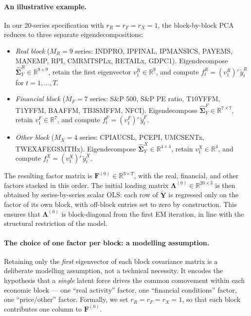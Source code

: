 \documentclass[11pt, a4paper, oneside]{article}
\begin{document}
\paragraph{An illustrative example.}
In our 20-series specification with $r_R = r_F = r_X = 1$, the
block-by-block PCA reduces to three separate eigendecompositions:

\begin{itemize}[leftmargin=1.5em, itemsep=2pt]
  \item \emph{Real block} ($M_R = 9$ series: INDPRO, IPFINAL, IPMANSICS,
        PAYEMS, MANEMP, RPI, CMRMTSPLx, RETAILx, GDPC1).
        Eigendecompose $\widehat{\boldsymbol{\Sigma}}^R_Y \in \mathbb{R}^{9 \times 9}$,
        retain the first eigenvector $v^R_1 \in \mathbb{R}^9$, and compute
        $f^R_t = (v^R_1)'\,\tilde{y}^R_t$ for $t = 1, \ldots, T$.
  \item \emph{Financial block} ($M_F = 7$ series: S\&P 500, S\&P PE ratio,
        T10YFFM, T1YFFM, BAAFFM, TB3SMFFM, NFCI).
        Eigendecompose $\widehat{\boldsymbol{\Sigma}}^F_Y \in \mathbb{R}^{7 \times 7}$,
        retain $v^F_1 \in \mathbb{R}^7$, and compute
        $f^F_t = (v^F_1)'\,\tilde{y}^F_t$.
  \item \emph{Other block} ($M_X = 4$ series: CPIAUCSL, PCEPI, UMCSENTx,
        TWEXAFEGSMTHx).
        Eigendecompose $\widehat{\boldsymbol{\Sigma}}^X_Y \in \mathbb{R}^{4 \times 4}$,
        retain $v^X_1 \in \mathbb{R}^4$, and compute
        $f^X_t = (v^X_1)'\,\tilde{y}^X_t$.
\end{itemize}

The resulting factor matrix is
$\mathbf{F}^{(0)} \in \mathbb{R}^{3 \times T}$, with the real,
financial, and other factors stacked in this order. The initial
loading matrix $\boldsymbol{\Lambda}^{(0)} \in \mathbb{R}^{20 \times 3}$
is then obtained by series-by-series scalar OLS: each row of
$\tilde{\mathbf{Y}}$ is regressed only on the factor of its own block,
with off-block entries set to zero by construction. This ensures
that $\boldsymbol{\Lambda}^{(0)}$ is block-diagonal from the first
EM iteration, in line with the structural restriction of the model.

\paragraph{The choice of one factor per block: a modelling assumption.}
Retaining only the \emph{first} eigenvector of each block covariance
matrix is a deliberate modelling assumption, not a technical
necessity. It encodes the hypothesis that a \emph{single} latent
force drives the common comovement within each economic block — one
``real activity'' factor, one ``financial conditions'' factor, one
``price/other'' factor. Formally, we set $r_R = r_F = r_X = 1$, so
that each block contributes one column to $\mathbf{F}^{(0)}$.
\end{document}
